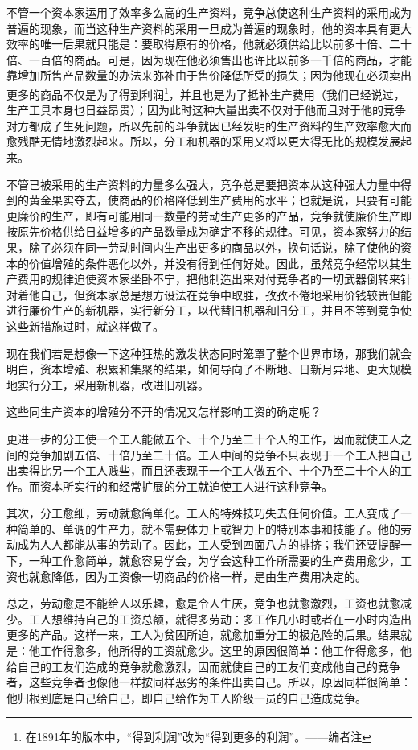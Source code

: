 \documentclass[a4paper,twoside,12pt,AutoFakeBold]{ctexart}
\begin{document}
不管一个资本家运用了效率多么高的生产资料，竞争总使这种生产资料的采用成为普遍的现象，而当这种生产资料的采用一旦成为普遍的现象时，他的资本具有更大效率的唯一后果就只能是：要取得原有的价格，他就必须供给比以前多十倍、二十倍、一百倍的商品。可是，因为现在他必须售出也许比以前多一千倍的商品，才能靠增加所售产品数量的办法来弥补由于售价降低所受的损失；因为他现在必须卖出更多的商品不仅是为了得到利润\footnote{在1891年的版本中，“得到利润”改为“得到更多的利润”。——编者注}，并且也是为了抵补生产费用（我们已经说过，生产工具本身也日益昂贵）；因为此时这种大量出卖不仅对于他而且对于他的竞争对方都成了生死问题，所以先前的斗争就因已经发明的生产资料的生产效率愈大而愈残酷无情地激烈起来。所以，分工和机器的采用又将以更大得无比的规模发展起来。

不管已被采用的生产资料的力量多么强大，竞争总是要把资本从这种强大力量中得到的黄金果实夺去，使商品的价格降低到生产费用的水平；也就是说，只要有可能更廉价的生产，即有可能用同一数量的劳动生产更多的产品，竞争就使廉价生产即按原先价格供给日益增多的产品数量成为确定不移的规律。可见，资本家努力的结果，除了必须在同一劳动时间内生产出更多的商品以外，换句话说，除了使他的资本的价值增殖的条件恶化以外，并没有得到任何好处。因此，虽然竞争经常以其生产费用的规律迫使资本家坐卧不宁，把他制造出来对付竞争者的一切武器倒转来针对着他自己，但资本家总是想方设法在竞争中取胜，孜孜不倦地采用价钱较贵但能进行廉价生产的新机器，实行新分工，以代替旧机器和旧分工，并且不等到竞争使这些新措施过时，就这样做了。

现在我们若是想像一下这种狂热的激发状态同时笼罩了整个世界市场，那我们就会明白，资本增殖、积累和集聚的结果，如何导向了不断地、日新月异地、更大规模地实行分工，采用新机器，改进旧机器。

这些同生产资本的增殖分不开的情况又怎样影响工资的确定呢？

更进一步的分工使一个工人能做五个、十个乃至二十个人的工作，因而就使工人之间的竞争加剧五倍、十倍乃至二十倍。工人中间的竞争不只表现于一个工人把自己出卖得比另一个工人贱些，而且还表现于一个工人做五个、十个乃至二十个人的工作。而资本所实行的和经常扩展的分工就迫使工人进行这种竞争。

其次，分工愈细，劳动就愈简单化。工人的特殊技巧失去任何价值。工人变成了一种简单的、单调的生产力，就不需要体力上或智力上的特别本事和技能了。他的劳动成为人人都能从事的劳动了。因此，工人受到四面八方的排挤；我们还要提醒一下，一种工作愈简单，就愈容易学会，为学会这种工作所需要的生产费用愈少，工资也就愈降低，因为工资像一切商品的价格一样，是由生产费用决定的。

总之，劳动愈是不能给人以乐趣，愈是令人生厌，竞争也就愈激烈，工资也就愈减少。工人想维持自己的工资总额，就得多劳动：多工作几小时或者在一小时内造出更多的产品。这样一来，工人为贫困所迫，就愈加重分工的极危险的后果。结果就是：他工作得愈多，他所得的工资就愈少。这里的原因很简单：他工作得愈多，他给自己的工友们造成的竞争就愈激烈，因而就使自己的工友们变成他自己的竞争者，这些竞争者也像他一样按同样恶劣的条件出卖自己。所以，原因同样很简单：他归根到底是自己给自己，即自己给作为工人阶级一员的自己造成竞争。
\end{document}

